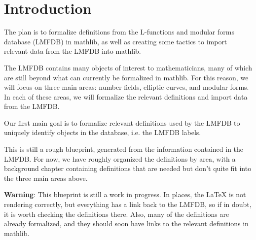 %

\tableofcontents

\chapter{Introduction}

The plan is to formalize definitions from the L-functions and modular forms database (LMFDB) in mathlib, as well as creating some tactics to import relevant data from the LMFDB into mathlib.

The LMFDB contains many objects of interest to mathematicians, many of which are still beyond what can currently be formalized in mathlib. For this reason, we will focus on three main areas: number fields, elliptic curves, and modular forms. In each of these areas, we will formalize the relevant definitions and import data from the LMFDB.

Our first main goal is to formalize relevant definitions used by the LMFDB to uniquely identify objects in the database, i.e. the LMFDB labels.

This is still a rough blueprint, generated from the information contained in the LMFDB. For now, we have roughly organized the definitions by area, with a background chapter containing definitions that are needed but don't quite fit into the three main areas above.

\textbf{Warning}: This blueprint is still a work in progress. In places, the LaTeX is not rendering correctly, but everything has a link back to the LMFDB, so if in doubt, it is worth checking the definitions there. Also, many of the definitions are already formalized, and they should soon have links to the relevant definitions in mathlib.





